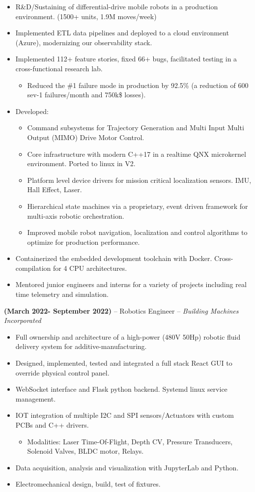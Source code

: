 \documentclass[11pt,a4paper]{article}
\newcommand{\jobentry}[2]{
  \vspace{0.5\baselineskip}\textbf{#1} -- #2 
}
\begin{document}
\begin{itemize}
\item R\&D/Sustaining of differential-drive mobile robots in a production environment. (1500+ units, 1.9M moves/week)
\item Implemented ETL data pipelines and deployed to a cloud environment (Azure), modernizing our observability stack.
\item Implemented 112+ feature stories, fixed 66+ bugs, facilitated testing in a cross-functional research lab.
  \begin{itemize}
  \item Reduced the \#1 failure mode in production by 92.5\% (a reduction of 600 sev-1 failures/month and 750k\$ losses).  
  \end{itemize}
\item Developed:
  \begin{itemize}
  \item Command subsystems for Trajectory Generation and Multi Input Multi Output (MIMO) Drive Motor Control. 
  \item Core infrastructure with modern C++17 in a realtime QNX microkernel environment. Ported to linux in V2.
  \item Platform level device drivers for mission critical localization sensors. IMU, Hall Effect, Laser. 
  \item Hierarchical state machines via a proprietary, event driven framework for multi-axis robotic orchestration. 
  \item Improved mobile robot navigation, localization and control algorithms to optimize for production performance. 
  \end{itemize}
\item Containerized the embedded development toolchain with Docker. Cross-compilation for 4 CPU architectures.
\item Mentored junior engineers and interns for a variety of projects including real time telemetry and simulation.
\end{itemize}
\jobentry{(March 2022- September 2022)}{Robotics Engineer -- \textit{Building Machines Incorporated}}
\begin{itemize}
\item Full ownership and architecture of a high-power (480V 50Hp) robotic fluid delivery system for additive-manufacturing.
\item Designed, implemented, tested and integrated a full stack React GUI to override physical control panel.
\item WebSocket interface and Flask python backend. Systemd linux service management.
\item IOT integration of multiple I2C and SPI sensors/Actuators with custom PCBs and C++ drivers.
\begin{itemize}
\item Modalities: Laser Time-Of-Flight, Depth CV, Pressure Transducers, Solenoid Valves, BLDC motor, Relays.
\end{itemize}
\item Data acquisition, analysis and visualization with JupyterLab and Python.
\item Electromechanical design, build, test of fixtures.
\end{itemize}
\end{document}
